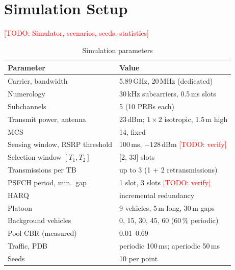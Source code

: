 \documentclass[conference]{IEEEtran}
\newcommand{\todo}[1]{\textcolor{red}{[TODO: #1]}}
\begin{document}
\section{Simulation Setup}\label{sec:setup}
\todo{Simulator, scenarios, seeds, statistics}

\begin{table}[t]
\centering
\caption{Simulation parameters}\label{tab:params}
\begin{tabular*}{\columnwidth}{@{\extracolsep{\fill}}ll@{}}
\toprule
Parameter & Value \\
\midrule
Carrier, bandwidth & 5.89\,GHz, 20\,MHz (dedicated) \\
Numerology & 30\,kHz subcarriers, 0.5\,ms slots \\
Subchannels & 5 (10 PRBs each) \\
Transmit power, antenna & 23\,dBm; $1\times2$ isotropic, 1.5\,m high \\
MCS & 14, fixed \\
Sensing window, RSRP threshold & 100\,ms, $-128$\,dBm \todo{verify} \\
Selection window $[T_1,T_2]$ & [2, 33] slots \\
Transmissions per TB & up to 3 (1 + 2 retransmissions) \\
PSFCH period, min.\ gap & 1 slot, 3 slots \todo{verify} \\
HARQ & incremental redundancy \\
Platoon & 9 vehicles, 5\,m long, 30\,m gaps \\
Background vehicles & 0, 15, 30, 45, 60 (60\,\% periodic) \\
Pool CBR (measured) & 0.01--0.69 \\
Traffic, PDB & periodic 100\,ms; aperiodic 50\,ms \\
Seeds & 10 per point \\
\bottomrule
\end{tabular*}
\end{table}

\end{document}

